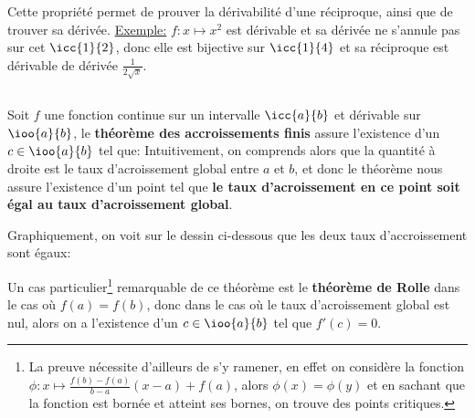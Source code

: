 Cette propriété permet de prouver la dérivabilité d'une réciproque, ainsi que de trouver sa dérivée.\+
\underline{Exemple:} \(f: x \mapsto x^2\) est dérivable et sa dérivée ne s'annule pas sur cet \(\icc{1}{2}\), donc elle est bijective sur \(\icc{1}{4}\) et sa réciproque est dérivable de dérivée \(\frac{1}{2\sqrt{x}}\).

\subsection*{}

Soit \(f\) une fonction continue sur un intervalle \(\icc{a}{b}\) et dérivable sur \(\ioo{a}{b}\), le \textbf{théorème des accroissements finis} assure l'existence d'un \(c \in \ioo{a}{b}\) tel que:
Intuitivement, on comprends alors que la quantité à droite est le taux d'acroissement global entre \(a\) et \(b\), et donc le théorème nous assure l'existence d'un point tel que \textbf{le taux d'acroissement en ce point soit égal au taux d'acroissement global}.
\pagebreak

Graphiquement, on voit sur le dessin ci-dessous que les deux taux d'accroissement sont égaux:
\begin{center}
\end{center}
Un cas particulier\footnote[1]{La preuve nécessite d'ailleurs de s'y ramener, en effet on considère la fonction \(\phi : x \mapsto \frac{f(b) - f(a)}{b-a}(x -a) + f(a)\), alors \(\phi(x) = \phi(y)\) et en sachant que la fonction est bornée et atteint ses bornes, on trouve des points critiques.} remarquable de ce théorème est le \textbf{théorème de Rolle} dans le cas où \(f(a) = f(b)\), donc dans le cas où le taux d'acroissement global est nul, alors on a l'existence d'un \(c \in \ioo{a}{b}\) tel que \(f'(c) = 0\).
